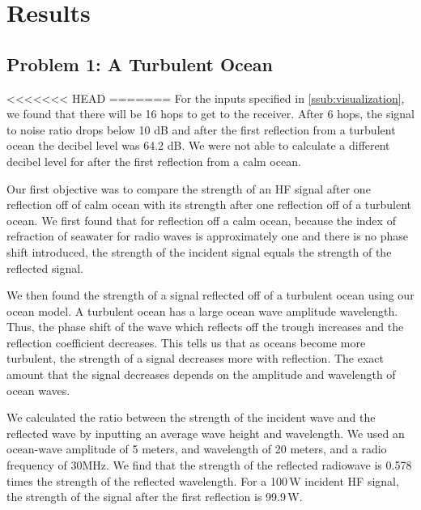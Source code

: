 \documentclass[11pt]{article}
\numberwithin{equation}{section}
\begin{document}
\section{Results} %
\label{sec:results}

 \subsection{Problem 1: A Turbulent Ocean} %
<<<<<<< HEAD
=======
For the inputs specified in \ref{ssub:visualization}, we found that there will be 16 hops to get to the receiver. After 6 hops, the signal to noise ratio drops below 10 dB and after the first reflection from a turbulent ocean the decibel level was 64.2 dB. We were not able to calculate a different decibel level for after the first reflection from a calm ocean. 
 \label{sub:part_i}

 Our first objective was to compare the strength of an HF signal after one reflection off of calm ocean with its strength after one reflection off of a turbulent ocean.
We first found that for reflection off a calm ocean, because the index of refraction of seawater for radio waves is approximately one and there is no phase shift introduced, the strength of the incident signal equals the strength of the reflected signal.

We then found the strength of a signal reflected off of a turbulent ocean using our ocean model. A turbulent ocean has a large ocean wave amplitude wavelength. Thus, the phase shift of the wave which reflects off the trough increases and the reflection coefficient decreases. This tells us that as oceans become more turbulent, the strength of a signal decreases more with reflection. The exact amount that the signal decreases depends on the amplitude and wavelength of ocean waves.

We calculated the ratio between the strength of the incident wave and the reflected wave by inputting an average wave height and wavelength. We used an ocean-wave amplitude of 5 meters, and wavelength of 20 meters, and a radio frequency of 30\si{\mega\Hz}. We find that the strength of the reflected radiowave is 0.578 times the strength of the reflected wavelength. For a 100\,\si{\watt} incident HF signal, the strength of the signal after the first reflection is 99.9\,\si{\watt}.
\end{document}
